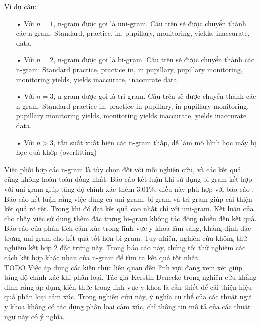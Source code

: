 Ví dụ câu: 
\begin{itemize}
\item[•]Với $n=1$, n-gram được gọi là uni-gram. Câu trên sẽ được chuyển thành các n-gram: Standard, practice, in, pupillary, monitoring, yields, inaccurate, data.
\item[•]Với $n=2$, n-gram được gọi là bi-gram. Câu trên sẽ được chuyển thành các n-gram: Standard practice, practice in, in pupillary, pupillary monitoring, monitoring yields, yields inaccurate, inaccurate data.
\item[•]Với $n=3$, n-gram được gọi là tri-gram. Câu trên sẽ được chuyển thành các n-gram: Standard practice in, practice in pupillary, in pupillary monitoring, pupillary monitoring yields, monitoring yields inaccurate, yields inaccurate data.
\item[•]Với $n>3$, tần suất xuất hiện các n-gram thấp, dễ làm mô hình học máy bị học quá khớp (overfitting)
\end{itemize}
	
Việc phối hợp các n-gram là tùy chọn đối với mỗi nghiên cứu, và các kết quả cũng không hoàn toàn đồng nhất. Báo cáo \cite{niu2005analysis} kết luận khi sử dụng bi-gram kết hợp với uni-gram giúp tăng độ chính xác thêm 3.01\%, điều này phù hợp với báo cáo \cite{sarker2011outcome}. Báo cáo \cite{sarker2011outcome} kết luận rằng việc dùng cả uni-gram, bi-gram và tri-gram giúp cải thiện kết quả rõ rệt. Trong khi đó \cite{pang2002thumbs} đạt kết quả cao nhất chỉ với uni-gram. Kết luận của \cite{pang2002thumbs} cho thấy việc sử dụng thêm đặc trưng bi-gram không tác động nhiều đến kết quả. Báo cáo của \cite{smith2012cross} phân tích cảm xúc trong lĩnh vực y khoa lâm sàng, khẳng định đặc trưng uni-gram cho kết quả tốt hơn bi-gram. Tuy nhiên, nghiên cứu không thử nghiệm kết hợp 2 đặc trưng này. Trong báo cáo này, chúng tôi thử nghiệm các cách kết hợp khác nhau của n-gram để tìm ra kết quả tốt nhất.\\

TODO Việc áp dụng các kiến thức liên quan đến lĩnh vực đang xem xét giúp tăng độ chính xác khi phân loại. Tác giả Kerstin Denecke trong nghiên cứu \cite{denecke2015sentiment} khẳng định rằng áp dụng kiến thức trong lĩnh vực y khoa là cần thiết để cải thiện hiệu quả phân loại cảm xúc. Trong nghiên cứu này, ý nghĩa cụ thể của các thuật ngữ y khoa không có tác dụng phân loại cảm xúc, chỉ thông tin mô tả của các thuật ngữ này có ý nghĩa.\\

